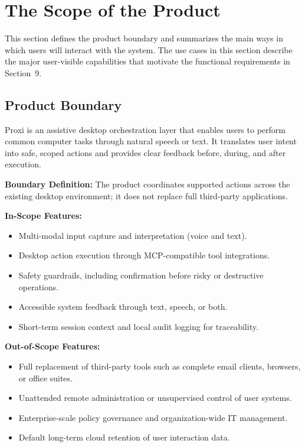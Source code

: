 \documentclass[12pt]{article}
\begin{document}
\section{The Scope of the Product}
This section defines the product boundary and summarizes the main ways
in which users will interact with the system. The use cases in this
section describe the major user-visible capabilities that motivate the
functional requirements in Section~9.

\subsection{Product Boundary}
Proxi is an assistive desktop orchestration layer that enables users
to perform common computer tasks through natural speech or text. It
translates user intent into safe, scoped actions and provides clear
feedback before, during, and after execution.

\textbf{Boundary Definition:}
The product coordinates supported actions across the existing desktop
environment; it does not replace full third-party applications.

\textbf{In-Scope Features:}
\begin{itemize}
  \item Multi-modal input capture and interpretation (voice and text).
  \item Desktop action execution through MCP-compatible tool
  integrations.
  \item Safety guardrails, including confirmation before risky or
  destructive operations.
  \item Accessible system feedback through text, speech, or both.
  \item Short-term session context and local audit logging for
  traceability.
\end{itemize}

\textbf{Out-of-Scope Features:}
\begin{itemize}
  \item Full replacement of third-party tools such as complete email
  clients, browsers, or office suites.
  \item Unattended remote administration or unsupervised control of
  user systems.
  \item Enterprise-scale policy governance and organization-wide IT
  management.
  \item Default long-term cloud retention of user interaction data.
\end{itemize}
\end{document}
